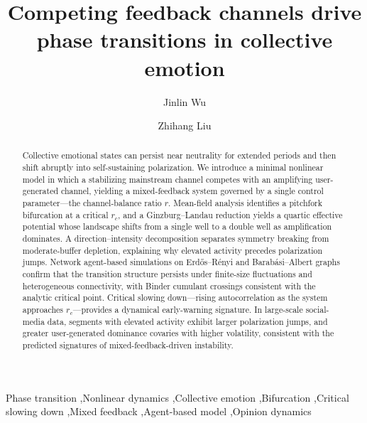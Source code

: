 \documentclass[preprint,12pt]{elsarticle}
\begin{document}
\begin{frontmatter}

\title{Competing feedback channels drive phase transitions in collective emotion}

\author[ust]{Jinlin Wu}
\author[cuhk]{Zhihang Liu}


\address[ust]{Urban Governance and Design Thrust, The Hong Kong University of Science and Technology (Guangzhou), Guangzhou 511400, China}
\address[cuhk]{Institute of Space and Earth Information Science, The Chinese University of Hong Kong, Shatin, Hong Kong, China}

\begin{abstract}
Collective emotional states can persist near neutrality for extended periods and then shift abruptly into self-sustaining polarization. We introduce a minimal nonlinear model in which a stabilizing mainstream channel competes with an amplifying user-generated channel, yielding a mixed-feedback system governed by a single control parameter---the channel-balance ratio $r$. Mean-field analysis identifies a pitchfork bifurcation at a critical $r_c$, and a Ginzburg--Landau reduction yields a quartic effective potential whose landscape shifts from a single well to a double well as amplification dominates. A direction--intensity decomposition separates symmetry breaking from moderate-buffer depletion, explaining why elevated activity precedes polarization jumps. Network agent-based simulations on Erd\H{o}s--R\'enyi and Barab\'asi--Albert graphs confirm that the transition structure persists under finite-size fluctuations and heterogeneous connectivity, with Binder cumulant crossings consistent with the analytic critical point. Critical slowing down---rising autocorrelation as the system approaches $r_c$---provides a dynamical early-warning signature. In large-scale social-media data, segments with elevated activity exhibit larger polarization jumps, and greater user-generated dominance covaries with higher volatility, consistent with the predicted signatures of mixed-feedback-driven instability.
\end{abstract}

\begin{keyword}
Phase transition \sep Nonlinear dynamics \sep Collective emotion \sep Bifurcation \sep Critical slowing down \sep Mixed feedback \sep Agent-based model \sep Opinion dynamics
\end{keyword}

\end{frontmatter}
\end{document}
